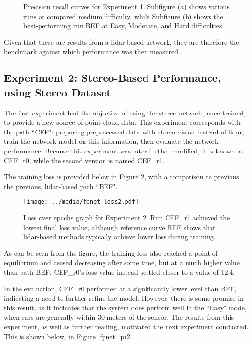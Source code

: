 \begin{figure}[H]
	\centering
	\caption{Precision recall curves for Experiment 1. Subfigure (a) shows various runs at compared medium difficulty, while Subfigure (b) shows the best-performing run BEF at Easy, Moderate, and Hard difficulties.}
	\label{fpnet_pr1}
\end{figure}




Given that these are results from a lidar-based network, they are therefore the benchmark against which performance was then measured. 

\subsection{Experiment 2: Stereo-Based Performance, using Stereo Dataset}
The first experiment had the objective of using the stereo network, once trained, to provide a new source of point cloud data. This experiment corresponds with the path ``CEF": preparing preprocessed data with stereo vision instead of lidar, train the network model on this information, then evaluate the network performance. Because this experiment was later further modified, it is known as CEF\_r0, while the second version is named CEF\_r1. 


The training loss is provided below in Figure \ref{fpnet_loss2}, with a comparison to previous the previous, lidar-based path ``BEF". 

\begin{figure}[ht]
	\centering
	\texttt{[image: ../media/fpnet\_loss2.pdf]}
	\caption{Loss over epochs graph for Experiment 2. Run CEF\_r1 achieved the lowest final loss value, although reference curve BEF shows that lidar-based methods typically achieve lower loss during training.}
	\label{fpnet_loss2}
\end{figure}

As can be seen from the figure, the training loss also reached a point of equilibrium and ceased decreasing after some time, but at a much higher value than path BEF. CEF\_r0's loss value instead settled closer to a value of 12.4. 

In the evaluation, CEF\_r0 performed at a significantly lower level than BEF, indicating a need to further refine the model. However, there is some promise in this result, as it indicates that the system does perform well in the ``Easy" mode, when cars are generally within 30 meters of the sensor. The results from this experiment, as well as further reading, motivated the next experiment conducted. This is shown below, in Figure \ref{fpnet_pr2}.


